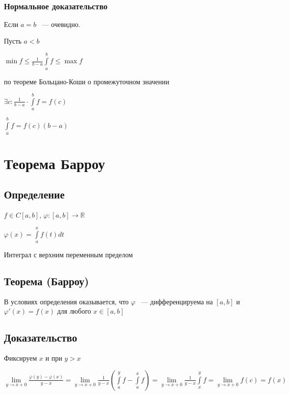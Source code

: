 \documentclass{article}
\begin{document}
            \subsubsection{Нормальное доказательство}
		
                Если $a = b$ ~--- очевидно.
			
                Пусть $a < b$
			
                $\min f \leq \frac{1}{b - a} \int\limits^b_a f \leq \max f$
			
                по теореме Больцано-Коши о промежуточном значении
			
                $\exists c : \frac{1}{b - a} \cdot \int\limits^b_a f = f(c)$
                
                $\int\limits^b_a f = f(c)(b - a)$
			
	\newpage
	
	\section{Теорема Барроу}
	
		\subsection{Определение}
		
			$f \in C[a, b]$, $\varphi : [a, b] \rightarrow \mathbb{R}$
		
			$\varphi (x) = \int\limits^x_a f(t)dt$
		
			Интеграл с верхним переменным пределом
		
		\subsection{Теорема (Барроу)}
		
			В условиях определения оказывается, что $\varphi$ ~--- дифференцируема на $[a, b]$ и $\varphi'(x) = f(x)$ для любого $x \in [a, b]$
		
		\subsection{Доказательство}
		
			Фиксируем $x$ и при $y > x$
		
			$\lim\limits_{y \rightarrow x + 0} \frac{\varphi(y) - \varphi(x)}{y - x} = \lim\limits_{y \rightarrow x + 0} \frac{1}{y - x} \left( \int\limits^y_a f - \int\limits^x_a f \right) = \lim\limits_{y \rightarrow x + 0} \frac{1}{y - x} \int\limits^y_x f = \lim\limits_{y \rightarrow x + 0} f(c) = f(x)$
		
\end{document}
